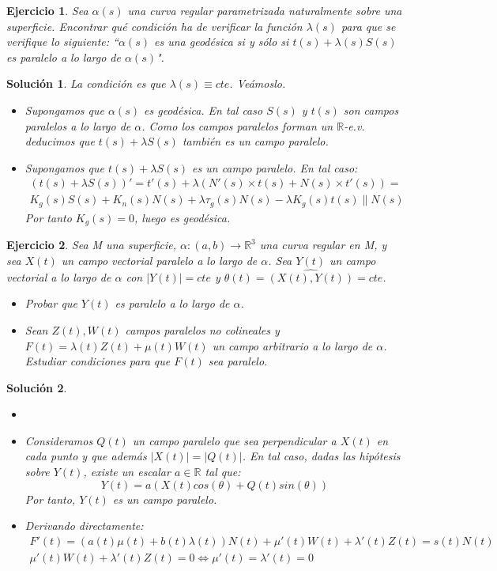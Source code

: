 \documentclass{article}
\theoremstyle{plain}
\newtheorem{exercise}{Ejercicio}
\newtheorem*{sol*}{Solución}
\newcommand{\R}{\mathbb{R}}
\begin{document}
\newpage
\begin{exercise} Sea $\alpha(s)$ una curva regular parametrizada naturalmente sobre una superficie. Encontrar qué condición ha de verificar la función $\lambda(s)$ para que se verifique lo siguiente: ``$\alpha(s)$ es una geodésica si y sólo si $t(s) + \lambda(s)S(s)$ es paralelo a lo largo de $\alpha(s)$".
\end{exercise}
\begin{sol*}
La condición es que $\lambda(s)\equiv cte$. Veámoslo.
\begin{itemize}
\item Supongamos que $\alpha(s)$ es geodésica. En tal caso $S(s)$ y $t(s)$ son campos paralelos a lo largo de $\alpha$. Como los campos paralelos forman un $\R$-e.v. deducimos que $t(s)+\lambda S(s)$ también es un campo paralelo.
\item Supongamos que $t(s)+\lambda S(s)$ es un campo paralelo. En tal caso:
\begin{gather*}
(t(s)+\lambda S(s))' = t'(s) + \lambda(N'(s)\times t(s) + N(s)\times t'(s))= \\
K_g(s) S(s) + K_n(s)N(s)+ \lambda \tau_g(s) N(s) - \lambda K_g(s)t(s) \parallel N(s)
\end{gather*}
Por tanto $K_g(s) = 0$, luego es geodésica.
\end{itemize}
\end{sol*}

\newpage
\begin{exercise}
Sea M una superficie, $\alpha:(a,b)\rightarrow \R^3$ una curva regular en M, y sea $X(t)$ un campo vectorial paralelo a lo largo de $\alpha$. Sea $Y(t)$ un campo vectorial a lo largo de $\alpha$ con $|Y(t)|=cte$ y $\theta(t)=\widehat{(X(t),Y(t))} = cte$.
\begin{itemize}
\item Probar que $Y(t)$ es paralelo a lo largo de $\alpha$. 
\item Sean $Z(t),W(t)$ campos paralelos no colineales y $F(t)=\lambda(t) Z(t)+\mu(t) W(t)$ un campo arbitrario a lo largo de $\alpha$. Estudiar condiciones para que $F(t)$ sea paralelo.
\end{itemize} 
\end{exercise}
\begin{sol*}
\begin{itemize}
\item[]
\item Consideramos $Q(t)$ un campo paralelo que sea perpendicular a $X(t)$ en cada punto y que además $|X(t)|=|Q(t)|$. En tal caso, dadas las hipótesis sobre $Y(t)$, existe un escalar $a\in\R$ tal que:
\[
Y(t) = a(X(t)cos(\theta) + Q(t)sin(\theta))
\]
Por tanto, $Y(t)$ es un campo paralelo.
\item Derivando directamente:
\begin{gather*}
F'(t) = (a(t)\mu(t)+b(t)\lambda(t))N(t) + \mu'(t)W(t)+\lambda'(t)Z(t) = s(t)N(t)\\
 \mu'(t)W(t)+\lambda'(t)Z(t) = 0 \Leftrightarrow \mu'(t)=\lambda'(t)=0
\end{gather*}
\end{itemize}
\end{sol*}
\end{document}
